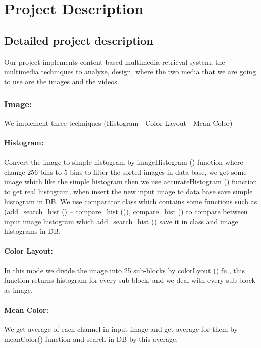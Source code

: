 \chapter{Project Description}
\section{Detailed project description}


Our project implements content-based multimedia retrieval system, the multimedia techniques to analyze, design,
 where the two media that we are going to use are the images and the videos.
 \vskip 0.25in

\subsection{Image:}
We implement three techniques (Histogram - Color Layout - Mean Color)
\vskip 0.2in
\subsubsection{Histogram:}
Convert the image to simple histogram by imageHistogram () function where change 256 bins to 5 bins to filter 
the sorted images in data base, we get some image which like the simple histogram then we use accurateHistogram ()
 function to get real histogram, when insert the new input image to data base save simple histogram in DB.
\vskip 0.2in
 We use comparator class which contains some functions such as\linebreak 
 (add\_search\_hist () – compare\_hist ()),
compare\_hist () to compare between input image histogram which add\_search\_hist () save it in class  
 and image histograms in DB.

\vskip 0.2in
\subsubsection{Color Layout:}
In this mode we divide the image into 25 sub-blocks by colorLyout () fn., this function returns 
histogram for every sub-block, and we deal with every sub-block as image.

\vskip 0.2in
\subsubsection{Mean Color:}
We get average of each channel in input image and get average for them by meanColor() function 
and search in DB by this average.

